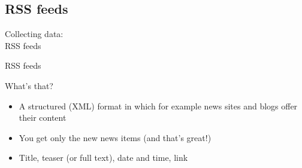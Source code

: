 \documentclass{beamer}
\begin{document}
%
%




\subsection{RSS feeds}
\begin{frame}
	Collecting data:\\
	RSS feeds
\end{frame}

\begin{frame}{RSS feeds}
	\begin{block}{What's that?}
		\begin{itemize}
			\item<1-> A structured (XML) format in which for example news sites and blogs offer their content
			\item<2-> You get only the new news items (and that's great!)
			\item<3-> Title, teaser (or full text), date and time, link
		\end{itemize}
	\end{block}
\end{frame}
\end{document}
